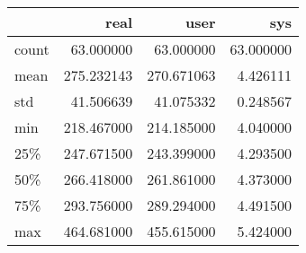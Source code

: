 \begin{tabular}{lrrr}
\toprule
{} &        real &        user &        sys \\
\midrule
count &   63.000000 &   63.000000 &  63.000000 \\
mean  &  275.232143 &  270.671063 &   4.426111 \\
std   &   41.506639 &   41.075332 &   0.248567 \\
min   &  218.467000 &  214.185000 &   4.040000 \\
25\%   &  247.671500 &  243.399000 &   4.293500 \\
50\%   &  266.418000 &  261.861000 &   4.373000 \\
75\%   &  293.756000 &  289.294000 &   4.491500 \\
max   &  464.681000 &  455.615000 &   5.424000 \\
\bottomrule
\end{tabular}
